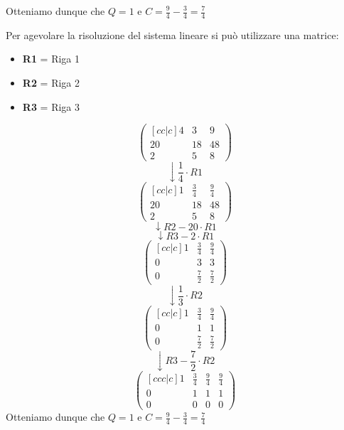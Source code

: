 \documentclass[a4paper]{article}
\theoremstyle{break}
\theoremstyle{break}
\theoremstyle{break}
\theoremstyle{break}
\begin{document}
\begin{example}
  \noindent Otteniamo dunque che \( Q = 1 \) e \( C = \frac{9}{4} - \frac{3}{4} = \frac{7}{4} \) 

  \vspace{0.5cm}

  \noindent Per agevolare la risoluzione del sistema lineare si può utilizzare una matrice:
  \begin{itemize}
    \item \textbf{R1} = Riga 1
    \item \textbf{R2} = Riga 2
    \item \textbf{R3} = Riga 3
  \end{itemize}
	\[
		\begin{pmatrix}[cc|c]
			4  & 3  & 9  \\
			20 & 18 & 48 \\
			2  & 5  & 8
		\end{pmatrix}
	\]
  \[\downarrow \frac{1}{4} \cdot R1 \]
	\[
		\begin{pmatrix}[cc|c]
			1  & \frac{3}{4} & \frac{9}{4} \\
			20 & 18          & 48          \\
			2  & 5           & 8
		\end{pmatrix}
	\]
  \[
  \downarrow R2 - 20 \cdot R1
  \] 
  \[
  \downarrow R3 - 2 \cdot R1
  \] 
	\[
		\begin{pmatrix} [cc|c]
			1 & \frac{3}{4} & \frac{9}{4} \\
			0 & 3           & 3           \\
			0 & \frac{7}{2} & \frac{7}{2}
		\end{pmatrix}
	\]
  \[
  \downarrow \frac{1}{3} \cdot R2
  \] 
	\[
		\begin{pmatrix}[cc|c]
			1 & \frac{3}{4} & \frac{9}{4} \\
			0 & 1           & 1           \\
			0 & \frac{7}{2}           &\frac{7}{2} 
		\end{pmatrix}
	\]
  \[
  \downarrow R3 - \frac{7}{2} \cdot R2
  \] 
  \[
    \begin{pmatrix}[ccc|c]
      1 & \frac{3}{4} & \frac{9}{4} & \frac{9}{4}\\
      0 & 1           & 1           & 1 \\
      0 & 0           & 0 & 0 
  \end{pmatrix} 
  \] 
  \noindent Otteniamo dunque che \( Q = 1 \) e \( C = \frac{9}{4} - \frac{3}{4} = \frac{7}{4} \)
\end{example}
\end{document}

